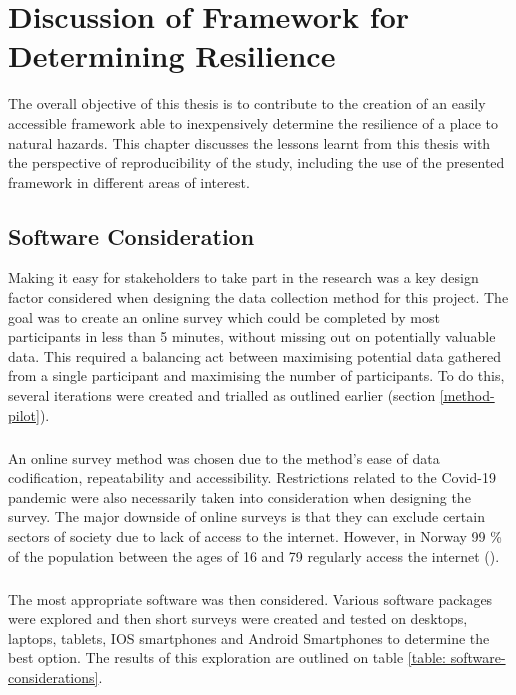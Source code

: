 \chapter{Discussion of Framework for Determining Resilience}\label{discussion-framework}

The overall objective of this thesis is to contribute to the creation of an easily accessible framework able to inexpensively determine the resilience of a place to natural hazards. This chapter discusses the lessons learnt from this thesis with the perspective of reproducibility of the study, including the use of the presented framework in different areas of interest.

\section{Software Consideration}
Making it easy for stakeholders to take part in the research was a key design factor considered when designing the data collection method for this project. The goal was to create an online survey which could be completed by most participants in less than 5 minutes, without missing out on potentially valuable data. This required a balancing act between maximising potential data gathered from a single participant and maximising the number of participants. To do this, several iterations were created and trialled as outlined earlier (section \ref{method-pilot}).
\paragraph{}
An online survey method was chosen due to the method's ease of data codification, repeatability and accessibility. Restrictions related to the Covid-19 pandemic were also necessarily taken into consideration when designing the survey. The major downside of online surveys is that they can exclude certain sectors of society due to lack of access to the internet. However, in Norway 99 \% of the population between the ages of 16 and 79 regularly access the internet (\cite{walther-zhang_ict_2022}). 
\paragraph{}
The most appropriate software was then considered.  Various software packages were explored and then short surveys were created and  tested on desktops, laptops, tablets, IOS smartphones and Android Smartphones to determine the best option. The results of this exploration are outlined on table \ref{table: software-considerations}.


